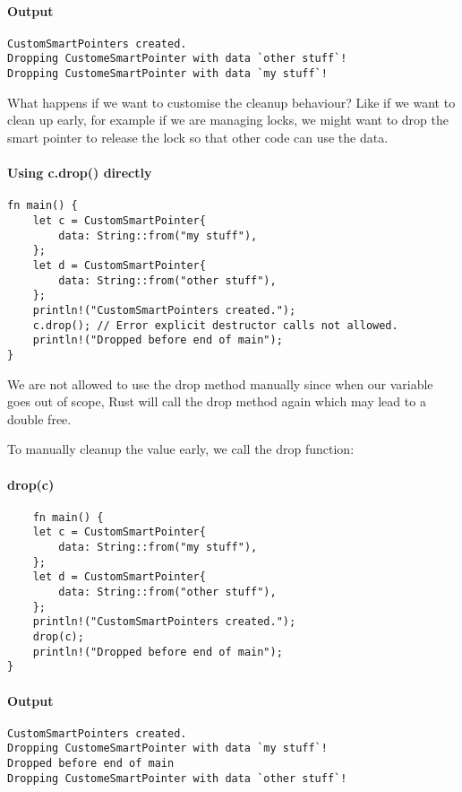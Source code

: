 \paragraph*{Output}\begin{lstlisting}
CustomSmartPointers created.
Dropping CustomeSmartPointer with data `other stuff`!
Dropping CustomeSmartPointer with data `my stuff`!
\end{lstlisting}

What happens if we want to customise the cleanup behaviour? Like if we want to clean up early, for example if we are managing locks, we might want to drop the smart pointer to release the lock so that other code can use the data.

\paragraph*{Using c.drop() directly}\begin{lstlisting}
fn main() {
    let c = CustomSmartPointer{
        data: String::from("my stuff"),
    };
    let d = CustomSmartPointer{
        data: String::from("other stuff"),
    };
    println!("CustomSmartPointers created.");
    c.drop(); // Error explicit destructor calls not allowed.
    println!("Dropped before end of main"); 
}    
\end{lstlisting}
We are not allowed to use the drop method manually since when our variable goes out of scope, Rust will call the drop method again which may lead to a double free.

To manually cleanup the value early, we call the drop function:
\newpage
\paragraph*{drop(c)}\begin{lstlisting}
    fn main() {
    let c = CustomSmartPointer{
        data: String::from("my stuff"),
    };
    let d = CustomSmartPointer{
        data: String::from("other stuff"),
    };
    println!("CustomSmartPointers created.");
    drop(c);
    println!("Dropped before end of main"); 
}
\end{lstlisting}

\paragraph*{Output}\begin{lstlisting}
CustomSmartPointers created.
Dropping CustomeSmartPointer with data `my stuff`!
Dropped before end of main
Dropping CustomeSmartPointer with data `other stuff`!
\end{lstlisting}
